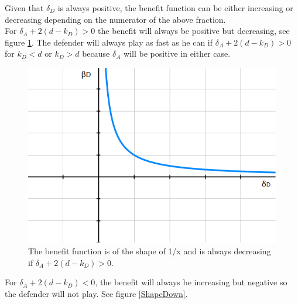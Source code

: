 Given that $\delta_{D}$ is always positive, the benefit function can be either increasing or decreasing depending on the numerator of the above fraction. \\

For $\delta_{A} + 2(d-k_{D}) > 0$ the benefit will always be positive but decreasing, see figure \ref{ShapeUp}. 
The defender will always play as fast as he can if $\delta_{A} + 2(d-k_{D}) > 0$ for $k_{D} < d$ or $k_{D} > d$ because $\delta_{A}$ will be positive in either case. \\
\begin{figure}
\centering
\includegraphics[scale=0.5]{Images/ShapesUp.png} 
\caption{The benefit function is of the shape of 1/x and is always decreasing if $\delta_{A} + 2(d-k_{D}) > 0$. }
\label{ShapeUp}
\end{figure}

For $\delta_{A} + 2(d-k_{D}) < 0$, the benefit will always be increasing but negative so the defender will not play. See figure \ref{ShapeDown}.  \\

